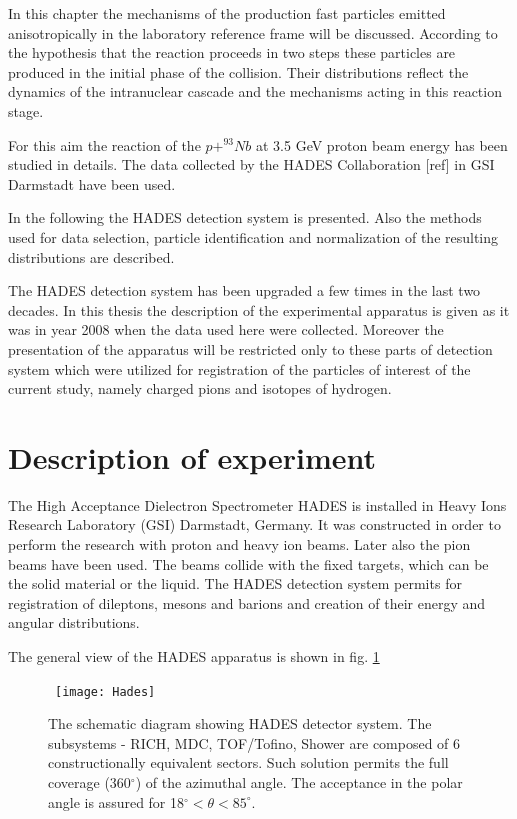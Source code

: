 In this chapter the mechanisms of the production fast particles emitted anisotropically in the laboratory reference frame will be discussed.
According to the hypothesis that the reaction proceeds in two steps these particles are produced in the initial phase of the collision. 
Their distributions reflect the dynamics of the intranuclear cascade and the mechanisms acting in this reaction stage.

For this aim the reaction of the $p + ^{93}Nb$ at 3.5 GeV proton beam energy has been studied in details. 
The data collected by the HADES Collaboration [ref]%
in GSI Darmstadt have been used.

In the following the HADES detection system is presented. Also the methods used for data selection, particle identification and normalization of the 
resulting distributions are described. 

The HADES detection system has been upgraded a few times in the last two decades. In this thesis the description of the experimental apparatus is given 
as it was in year 2008 when the data used here were collected. Moreover the presentation of the apparatus will be restricted only 
to these parts of detection system which were utilized for registration of the particles of interest of the current study, namely charged pions and isotopes of hydrogen.

\section{Description of experiment}

The High Acceptance Dielectron Spectrometer HADES is installed in Heavy Ions Research Laboratory 
(GSI) Darmstadt, Germany.
It was constructed in order to perform the research with proton and heavy ion beams. 
Later also the pion beams have been used.
The beams collide with the fixed targets, which can be the solid material or the liquid.
The HADES detection system permits for registration of dileptons, mesons and barions  
and creation of their energy and angular distributions. 

The general view of the HADES apparatus is shown in fig. \ref{Hades}

\begin{figure}
	\centering\
	\texttt{[image: Hades]}
	\caption{The schematic diagram showing HADES detector system.
	The subsystems - RICH, MDC, TOF/Tofino, Shower are composed of 6 constructionally 
	equivalent sectors. 
Such solution permits the full coverage (360$^{\circ}$) of the azimuthal angle.
The acceptance in the polar angle is assured for 18$^{\circ} < \theta < 85^{\circ}$.}
	\label{Hades}
\end{figure}

